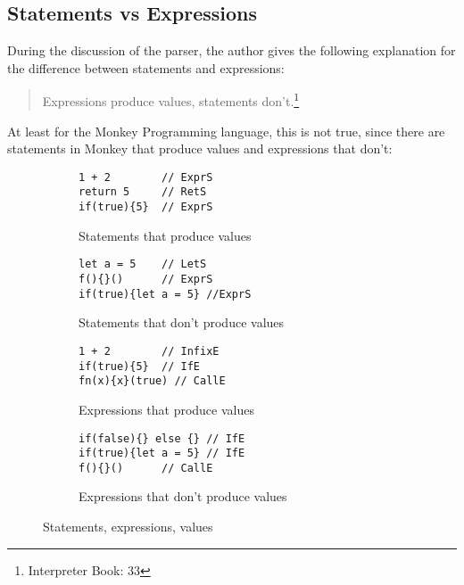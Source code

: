\documentclass[a4paper,10pt]{article}
\begin{document}
\subsection{Statements vs Expressions}

During the discussion of the parser, the author gives the following explanation for the difference between statements and expressions:

\begin{quote} %
Expressions produce values, statements don’t.\footnote{Interpreter Book: 33}
\end{quote}

At least for the Monkey Programming language, this is not true, since there are statements in Monkey that produce values and expressions that don't:
 
 
\begin{figure}[ht]
\begin{subfigure}{.5\textwidth}
\begin{tcolorbox}\small
\begin{verbatim}
1 + 2        // ExprS
return 5     // RetS
if(true){5}  // ExprS
\end{verbatim}
\end{tcolorbox}
\caption{Statements that produce values}
\end{subfigure}
\begin{subfigure}{.5\textwidth}
\begin{tcolorbox}\small
\begin{verbatim}
let a = 5    // LetS
f(){}()      // ExprS
if(true){let a = 5} //ExprS
\end{verbatim}
\end{tcolorbox}  
  \caption{Statements that don't produce values}
\end{subfigure}
\vskip 15pt
\begin{subfigure}{.5\textwidth}
\begin{tcolorbox}\small
\begin{verbatim}
1 + 2        // InfixE
if(true){5}  // IfE
fn(x){x}(true) // CallE
\end{verbatim}
\end{tcolorbox} 
  \caption{Expressions that produce values}
\end{subfigure}
\begin{subfigure}{.5\textwidth}
\begin{tcolorbox}\small
\begin{verbatim}
if(false){} else {} // IfE
if(true){let a = 5} // IfE
f(){}()      // CallE
\end{verbatim}
\end{tcolorbox}
  \caption{Expressions that don't produce values}
\end{subfigure}

\caption{Statements, expressions, values}
\end{figure}
\end{document}
